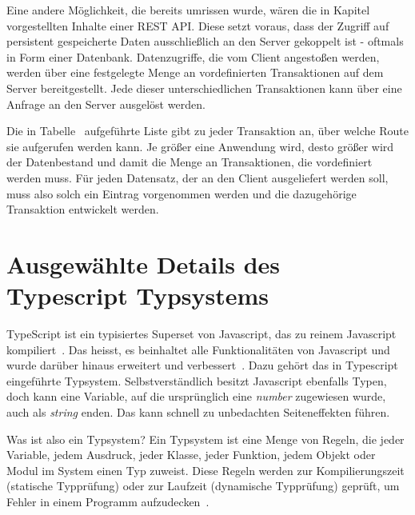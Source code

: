 Eine andere Möglichkeit, die bereits umrissen wurde, wären die in Kapitel~ vorgestellten Inhalte einer REST API.
Diese setzt voraus, dass der Zugriff auf persistent gespeicherte Daten ausschließlich an den Server gekoppelt ist - oftmals in Form einer Datenbank.
Datenzugriffe, die vom Client angestoßen werden, werden über eine festgelegte Menge an vordefinierten Transaktionen auf dem Server bereitgestellt.
Jede dieser unterschiedlichen Transaktionen kann über eine Anfrage an den Server ausgelöst werden.

Die in Tabelle~ aufgeführte Liste gibt zu jeder Transaktion an, über welche Route sie aufgerufen werden kann.
Je größer eine Anwendung wird, desto größer wird der Datenbestand und damit die Menge an Transaktionen, die vordefiniert werden muss.
Für jeden Datensatz, der an den Client ausgeliefert werden soll, muss also solch ein Eintrag vorgenommen werden und die dazugehörige Transaktion entwickelt werden.


\section{Ausgewählte Details des Typescript Typsystems}
\label{sec:basics:typescript}
TypeScript ist ein typisiertes Superset von Javascript, das zu reinem Javascript kompiliert~\cite{typescript}.
Das heisst, es beinhaltet alle Funktionalitäten von Javascript und wurde darüber hinaus erweitert und verbessert~\cite{superset}.
Dazu gehört das in Typescript eingeführte Typsystem. Selbstverständlich besitzt Javascript ebenfalls Typen, doch kann eine Variable,
auf die ursprünglich eine \emph{number} zugewiesen wurde, auch als \emph{string} enden. Das kann schnell zu unbedachten Seiteneffekten führen.

Was ist also ein Typsystem? Ein Typsystem ist eine Menge von Regeln, die jeder Variable, jedem Ausdruck, jeder Klasse,
jeder Funktion, jedem Objekt oder Modul im System einen Typ zuweist.
Diese Regeln werden zur  Kompilierungszeit (statische Typprüfung) oder zur Laufzeit (dynamische Typprüfung) geprüft,
um Fehler in einem Programm aufzudecken~\cite{typescript-typesystem-medium}.


